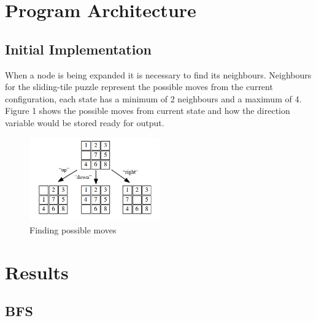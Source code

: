\documentclass[final]{cmpreport}
\begin{document}
\section{Program Architecture}

\subsection{Initial Implementation}

When a node is being expanded it is necessary to find its neighbours. Neighbours for the sliding-tile puzzle represent the possible moves from the current configuration, each state has a minimum of 2 neighbours and a maximum of 4. Figure 1 shows the possible moves from current state and how the direction variable would be stored ready for output. 

\begin{figure}[ht]
	\centering
	\includegraphics[width=0.5\textwidth]{moves}
	\captionsetup{justification=centering}
	\caption{Finding possible moves}
\end{figure}



\section{Results}
\subsection{BFS}
\end{document}

